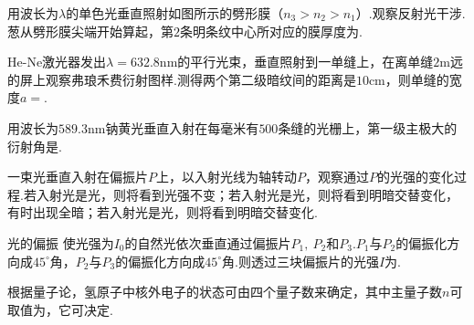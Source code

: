 \begin{exercise}[2]
    用波长为$\lambda$的单色光垂直照射如图所示的劈形膜（$n_3>n_2>n_1$）.观察反射光干涉.葱从劈形膜尖端开始算起，第$2$条明条纹中心所对应的膜厚度为\ans{}.
\end{exercise}

\begin{exercise}[2]{}
    He-Ne激光器发出$\lambda=632.8\mathrm{nm}$的平行光束，垂直照射到一单缝上，在离单缝$2\mathrm{m}$远的屏上观察弗琅禾费衍射图样.测得两个第二级暗纹间的距离是$10\mathrm{cm}$，则单缝的宽度$a=$\ans{}.
\end{exercise}

\begin{exercise}
    用波长为$589.3\mathrm{nm}$钠黄光垂直入射在每毫米有$500$条缝的光栅上，第一级主极大的衍射角是\ans{}.
\end{exercise}

\begin{exercise}[6]{}
    一束光垂直入射在偏振片$P$上，以入射光线为轴转动$P$，观察通过$P$的光强的变化过程.若入射光是光，则将看到光强不变；若入射光是光，则将看到明暗交替变化，有时出现全暗；若入射光是光，则将看到明暗交替变化.
\end{exercise}

\begin{exercise}[3]{光的偏振}
    使光强为$I_0$的自然光依次垂直通过偏振片$P_1,\ P_2$和$P_3$.$P_1$与$P_2$的偏振化方向成$45^{\circ}$角，$P_2$与$P_3$的偏振化方向成$45^{\circ}$角.则透过三块偏振片的光强$I$为.
\end{exercise}

\begin{exercise}[4]{}
    根据量子论，氢原子中核外电子的状态可由四个量子数来确定，其中主量子数$n$可取值为，它可决定.
\end{exercise}

